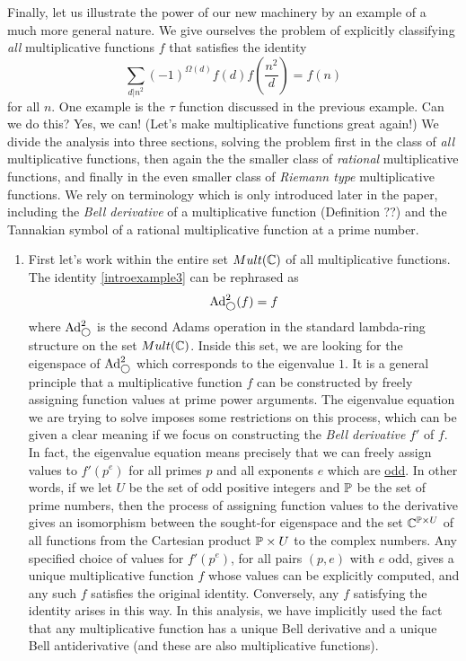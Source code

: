 \begin{example}
Finally, let us illustrate the power of our new machinery by an example of a much more general nature. We give ourselves the problem of explicitly classifying \emph{all} multiplicative functions $f$ that satisfies the identity 
\begin{equation} \label{introexample3}
\sum_{d \vert n^2} (-1)^{\Omega(d)} f(d) f (\frac{n^2}{d}) = f(n)  
\end{equation}
for all $n$. One example is the $\tau$ function discussed in the previous example. Can we do this? Yes, we can! (Let's make multiplicative functions great again!) We divide the analysis into three sections, solving the problem first in the class of \emph{all} multiplicative functions, then again the the smaller class of \emph{rational} multiplicative functions, and finally in the even smaller class of \emph{Riemann type} multiplicative functions. We rely on terminology which is only introduced later in the paper, including the \emph{Bell derivative} of a multiplicative function (Definition ??) and the Tannakian symbol of a rational multiplicative function at a prime number. 


\begin{enumerate}
\item First let's work within the entire set $Mult(\mathbb{C})$ of all multiplicative functions. The identity \ref{introexample3} can be rephrased as 
$$ \text{Ad}^{2}_{\bigcirc}(f) = f  $$
where $\text{Ad}^{2}_{\bigcirc}$ is the second Adams operation in the standard lambda-ring structure on the set $Mult(\mathbb{C})$. Inside this set, we are looking for the eigenspace of $\text{Ad}^{2}_{\bigcirc}$ which corresponds to the eigenvalue $1$. It is a general principle that a multiplicative function $f$ can be constructed by freely assigning function values at prime power arguments. The eigenvalue equation we are trying to solve imposes some restrictions on this process, which can be given a clear meaning if we focus on constructing the \emph{Bell derivative} $f'$ of $f$. In fact, the eigenvalue equation means precisely that we can freely assign values to $f'(p^e)$ for all primes $p$ and all exponents $e$ which are \underline{odd}. In other words, if we let $U$ be the set of odd positive integers and $\mathbb{P}$ be the set of prime numbers, then the process of assigning function values to the derivative gives an isomorphism between the sought-for eigenspace and the set $\mathbb{C}^{\mathbb{P} \times U}$ of all functions from the Cartesian product $\mathbb{P} \times U$ to the complex numbers. Any specified choice of values for $f'(p^e)$, for all pairs $(p, e)$  with $e$ odd, gives a unique multiplicative function $f$ whose values can be explicitly computed, and any such $f$ satisfies the original identity. Conversely, any $f$ satisfying the identity arises in this way. In this analysis, we have implicitly used the fact that any multiplicative function has a unique Bell derivative and a unique Bell antiderivative (and these are also multiplicative functions). 
 

\end{enumerate}
\end{example}
